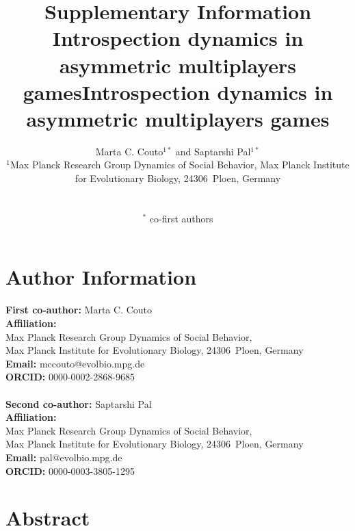 \documentclass[11pt]{article}
\title{\sffamily \Large Supplementary Information\\[0.1cm] {\bfseries Introspection dynamics in asymmetric multiplayers games}}
\title{\sffamily \Large {\bfseries Introspection dynamics in asymmetric multiplayers games}}
\date{\empty}
\author{\parbox[c]{16cm}{\centering \onehalfspacing \fontsize{11}{12}\selectfont Marta C. Couto$^{1*}$ and Saptarshi Pal$^{1*}$\\[0.2cm]
$^1$Max Planck Research Group Dynamics of Social Behavior, Max Planck Institute for Evolutionary Biology, 24306~Ploen, Germany}\\ \\
$^*$ \fontsize{11}{12}\selectfont co-first authors}
\theoremstyle{plainCl1}
\theoremstyle{plainCl2}
\begin{document}
\maketitle
\onehalfspacing
\section*{Author Information}
\textbf{First co-author:} Marta C. Couto \\
\noindent \textbf{Affiliation:} \\Max Planck Research Group Dynamics of Social Behavior, \\Max Planck Institute for Evolutionary Biology, 24306~Ploen, Germany \\ 
\noindent \textbf{Email:} mccouto@evolbio.mpg.de \\
\noindent \textbf{ORCID:} 0000-0002-2868-9685  \\ \\
\textbf{Second co-author:} Saptarshi Pal \\
\noindent \textbf{Affiliation:} \\Max Planck Research Group Dynamics of Social Behavior, \\Max Planck Institute for Evolutionary Biology, 24306~Ploen, Germany \\ 
\noindent \textbf{Email:} pal@evolbio.mpg.de \\
\noindent \textbf{ORCID:} 0000-0003-3805-1295
\newpage 
\section*{Abstract}

\end{document}
